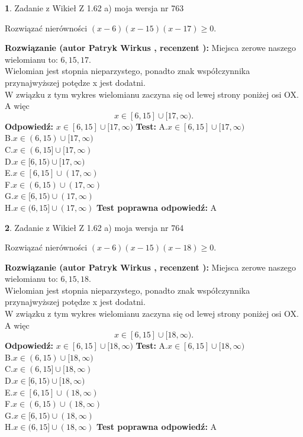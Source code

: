 \documentclass[12pt, a4paper]{article}
\theoremstyle{definition} %
\newtheorem{zad}{}
\newcommand{\zadStart}[1]{\begin{zad}#1\newline}
\newcommand{\zadStop}{\end{zad}}
\newcommand{\rozwStart}[2]{\noindent \textbf{Rozwiązanie (autor #1 , recenzent #2): }\newline}
\newcommand{\rozwStop}{\newline}
\newcommand{\odpStart}{\noindent \textbf{Odpowiedź:}\newline}
\newcommand{\odpStop}{\newline}
\newcommand{\testStart}{\noindent \textbf{Test:}\newline}
\newcommand{\testStop}{\newline}
\newcommand{\kluczStart}{\noindent \textbf{Test poprawna odpowiedź:}\newline}
\newcommand{\kluczStop}{\newline}
\begin{document}
\zadStart{Zadanie z Wikieł Z 1.62 a) moja wersja nr 763}

Rozwiązać nierówności $(x-6)(x-15)(x-17)\ge0$.
\zadStop
\rozwStart{Patryk Wirkus}{}
Miejsca zerowe naszego wielomianu to: $6, 15, 17$.\\
Wielomian jest stopnia nieparzystego, ponadto znak współczynnika przy\linebreak najwyższej potędze x jest dodatni.\\ W związku z tym wykres wielomianu zaczyna się od lewej strony poniżej osi OX. A więc $$x \in [6,15] \cup [17,\infty).$$
\rozwStop
\odpStart
$x \in [6,15] \cup [17,\infty)$
\odpStop
\testStart
A.$x \in [6,15] \cup [17,\infty)$\\
B.$x \in (6,15) \cup [17,\infty)$\\
C.$x \in (6,15] \cup [17,\infty)$\\
D.$x \in [6,15) \cup [17,\infty)$\\
E.$x \in [6,15] \cup (17,\infty)$\\
F.$x \in (6,15) \cup (17,\infty)$\\
G.$x \in [6,15) \cup (17,\infty)$\\
H.$x \in (6,15] \cup (17,\infty)$
\testStop
\kluczStart
A
\kluczStop



\zadStart{Zadanie z Wikieł Z 1.62 a) moja wersja nr 764}

Rozwiązać nierówności $(x-6)(x-15)(x-18)\ge0$.
\zadStop
\rozwStart{Patryk Wirkus}{}
Miejsca zerowe naszego wielomianu to: $6, 15, 18$.\\
Wielomian jest stopnia nieparzystego, ponadto znak współczynnika przy\linebreak najwyższej potędze x jest dodatni.\\ W związku z tym wykres wielomianu zaczyna się od lewej strony poniżej osi OX. A więc $$x \in [6,15] \cup [18,\infty).$$
\rozwStop
\odpStart
$x \in [6,15] \cup [18,\infty)$
\odpStop
\testStart
A.$x \in [6,15] \cup [18,\infty)$\\
B.$x \in (6,15) \cup [18,\infty)$\\
C.$x \in (6,15] \cup [18,\infty)$\\
D.$x \in [6,15) \cup [18,\infty)$\\
E.$x \in [6,15] \cup (18,\infty)$\\
F.$x \in (6,15) \cup (18,\infty)$\\
G.$x \in [6,15) \cup (18,\infty)$\\
H.$x \in (6,15] \cup (18,\infty)$
\testStop
\kluczStart
A
\kluczStop
\end{document}
